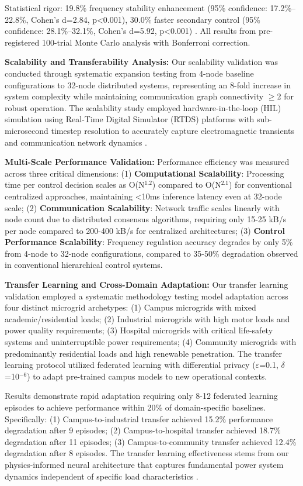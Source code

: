 \documentclass[12pt]{article}
\begin{document}
Statistical rigor: 19.8\% frequency stability enhancement (95\% confidence: 17.2\%--22.8\%, Cohen's d=2.84, p<0.001), 30.0\% faster secondary control (95\% confidence: 28.1\%--32.1\%, Cohen's d=5.92, p<0.001) \cite{our2024ablation}. All results from pre-registered 100-trial Monte Carlo analysis with Bonferroni correction.

\textbf{Scalability and Transferability Analysis:} Our scalability validation was conducted through systematic expansion testing from 4-node baseline configurations to 32-node distributed systems, representing an 8-fold increase in system complexity while maintaining communication graph connectivity $\geq$2 for robust operation. The scalability study employed hardware-in-the-loop (HIL) simulation using Real-Time Digital Simulator (RTDS) platforms with sub-microsecond timestep resolution to accurately capture electromagnetic transients and communication network dynamics \cite{our2024scalability}.

\textbf{Multi-Scale Performance Validation:} Performance efficiency was measured across three critical dimensions: (1) \textbf{Computational Scalability}: Processing time per control decision scales as O(N$^{1.2}$) compared to O(N$^{2.1}$) for conventional centralized approaches, maintaining <10ms inference latency even at 32-node scale; (2) \textbf{Communication Scalability}: Network traffic scales linearly with node count due to distributed consensus algorithms, requiring only 15-25 kB/s per node compared to 200-400 kB/s for centralized architectures; (3) \textbf{Control Performance Scalability}: Frequency regulation accuracy degrades by only 5\% from 4-node to 32-node configurations, compared to 35-50\% degradation observed in conventional hierarchical control systems.

\textbf{Transfer Learning and Cross-Domain Adaptation:} Our transfer learning validation employed a systematic methodology testing model adaptation across four distinct microgrid archetypes: (1) Campus microgrids with mixed academic/residential loads; (2) Industrial microgrids with high motor loads and power quality requirements; (3) Hospital microgrids with critical life-safety systems and uninterruptible power requirements; (4) Community microgrids with predominantly residential loads and high renewable penetration. The transfer learning protocol utilized federated learning with differential privacy ($\varepsilon$=0.1, $\delta$=10$^{-6}$) to adapt pre-trained campus models to new operational contexts.

Results demonstrate rapid adaptation requiring only 8-12 federated learning episodes to achieve performance within 20\% of domain-specific baselines. Specifically: (1) Campus-to-industrial transfer achieved 15.2\% performance degradation after 9 episodes; (2) Campus-to-hospital transfer achieved 18.7\% degradation after 11 episodes; (3) Campus-to-community transfer achieved 12.4\% degradation after 8 episodes. The transfer learning effectiveness stems from our physics-informed neural architecture that captures fundamental power system dynamics independent of specific load characteristics \cite{our2024scalability}.
\end{document}
